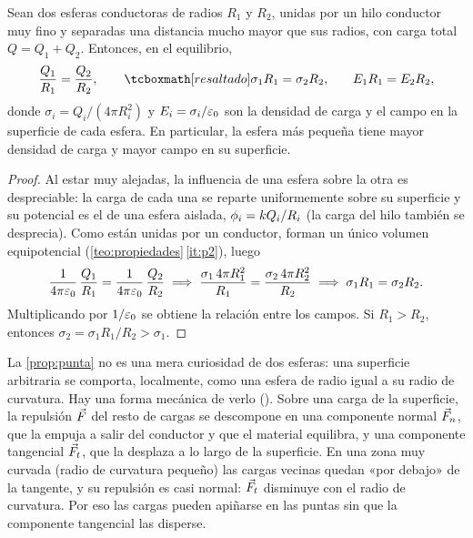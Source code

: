 \begin{proposicion}\label{prop:punta}
Sean dos esferas conductoras de radios $R_1$ y $R_2$, unidas por un hilo conductor muy fino y separadas una distancia mucho mayor que sus
radios, con carga total $Q=Q_1+Q_2$. Entonces, en el equilibrio,
\begin{equation}\label{eq:punta}
  \frac{Q_1}{R_1}=\frac{Q_2}{R_2},\qquad\resalta{\sigma_1R_1=\sigma_2R_2,}\qquad E_1R_1=E_2R_2 ,
\end{equation}
donde $\sigma_i=Q_i/(4\pi R_i^{2})$ y $E_i=\sigma_i/\varepsilon_{0}$ son la densidad de carga y el campo en la superficie de cada esfera. En particular, la
esfera más pequeña tiene mayor densidad de carga y mayor campo en su superficie.
\end{proposicion}
\begin{proof}
Al estar muy alejadas, la influencia de una esfera sobre la otra es despreciable: la carga de cada una se reparte uniformemente sobre su
superficie y su potencial es el de una esfera aislada, $\phi_i=k Q_i/R_i$ (la carga del hilo también se desprecia). Como están unidas por un
conductor, forman un único volumen equipotencial (\cref{teo:propiedades}\,\ref{it:p2}), luego
\[
  \frac{1}{4\pi\varepsilon_{0}}\,\frac{Q_1}{R_1}=\frac{1}{4\pi\varepsilon_{0}}\,\frac{Q_2}{R_2}
  \;\Longrightarrow\;\frac{\sigma_1\,4\pi R_1^{2}}{R_1}=\frac{\sigma_2\,4\pi R_2^{2}}{R_2}
  \;\Longrightarrow\;\sigma_1R_1=\sigma_2R_2 .
\]
Multiplicando por $1/\varepsilon_{0}$ se obtiene la relación entre los campos. Si $R_1>R_2$, entonces $\sigma_2=\sigma_1R_1/R_2>\sigma_1$.
\end{proof}



\begin{observacion}\label{obs:curvatura}
La \cref{prop:punta} no es una mera curiosidad de dos esferas: una superficie arbitraria se comporta, localmente, como una esfera de radio igual
a su radio de curvatura. Hay una forma mecánica de verlo (). Sobre una carga de la superficie, la repulsión
$\vec{F}$ del resto de cargas se descompone en una componente normal $\vec{F}_n$, que la empuja a salir del conductor y que el material equilibra, y
una componente tangencial $\vec{F}_t$, que la desplaza a lo largo de la superficie. En una zona muy curvada (radio de curvatura pequeño) las cargas
vecinas quedan «por debajo» de la tangente, y su repulsión es casi normal: $\vec{F}_t$ disminuye con el radio de curvatura. Por eso las cargas pueden
apiñarse en las puntas sin que la componente tangencial las disperse.
\end{observacion}

